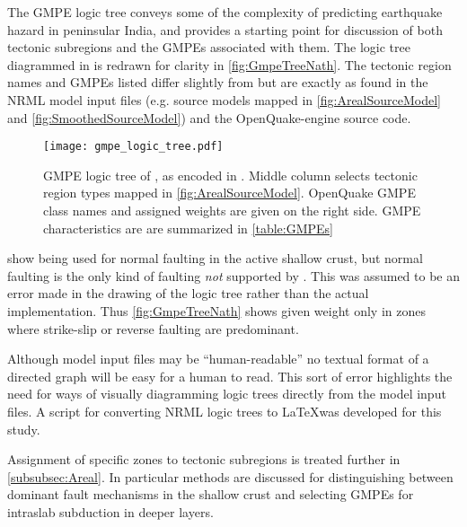 \documentclass{article}
\begin{document}
The GMPE logic tree conveys some of the complexity of predicting earthquake hazard in peninsular India, and provides a starting point for discussion of both tectonic subregions and the GMPEs associated with them. 
The logic tree diagrammed in \citet[Figure~3]{nath2012probabilistic} is redrawn for clarity in \autoref{fig:GmpeTreeNath}.
The tectonic region names and GMPEs listed differ slightly from \cite{nath2012probabilistic} but are exactly as found in the NRML model input files (e.g. source models mapped in \autoref{fig:ArealSourceModel} and  \autoref{fig:SmoothedSourceModel}) and the OpenQuake-engine source code.

\begin{figure}
\begin{adjustbox}{center}
\texttt{[image: gmpe\_logic\_tree.pdf]}
\end{adjustbox}
\caption[Original GMPE logic tree]{GMPE logic tree of \cite{nath2012probabilistic}, as encoded in \texttt{}.
Middle column selects tectonic region types mapped in \autoref{fig:ArealSourceModel}.
OpenQuake GMPE class names and assigned weights are given on the right side.
GMPE characteristics are are summarized in \autoref{table:GMPEs}}
\label{fig:GmpeTreeNath}
\end{figure}

\citet[Figure~3]{nath2012probabilistic} show \cite{sharma2009ground} being used for normal faulting in the active shallow crust, but normal faulting is the only kind of faulting \textit{not} supported by \cite{sharma2009ground}. 
This was assumed to be an error made in the drawing of the logic tree rather than the actual implementation.
Thus \autoref{fig:GmpeTreeNath} shows \cite{sharma2009ground} given weight only in zones where strike-slip or reverse faulting are predominant.

Although model input files may be ``human-readable'' no textual format of a directed graph will be easy for a human to read.
This sort of error highlights the need for ways of visually diagramming logic trees directly from the model input files. 
A script for converting NRML logic trees to \LaTeX\space was developed for this study.

Assignment of specific zones to tectonic subregions is treated further in \autoref{subsubsec:Areal}.
In particular methods are discussed for distinguishing between dominant fault mechanisms in the shallow crust and selecting GMPEs for intraslab subduction in deeper layers.
\end{document}
